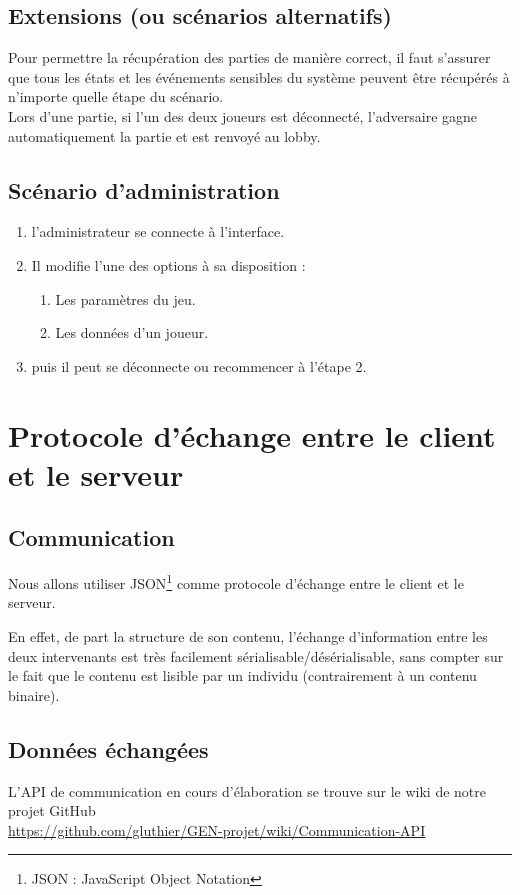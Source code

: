\documentclass[a4paper,11pt]{article}
\begin{document}
		\subsection{Extensions (ou scénarios alternatifs)}
		Pour permettre la récupération des parties de manière correct, il faut s'assurer que tous les états et les événements sensibles du système peuvent être récupérés à n'importe quelle étape du scénario. \\

		Lors d'une partie, si l'un des deux joueurs est déconnecté, l'adversaire gagne automatiquement la partie et est renvoyé au lobby.

		\subsection{Scénario d'administration}
		\begin{enumerate}
			\item l'administrateur se connecte à l'interface.
			\item Il modifie l'une des options à sa disposition :
			\begin{enumerate}
				\item Les paramètres du jeu.
				\item Les données d'un joueur.
			\end{enumerate}
			\item puis il peut se déconnecte ou recommencer à l'étape 2.
		\end{enumerate}


	\newpage
	\section{Protocole d'échange entre le client et le serveur}
		\subsection{Communication}
			Nous allons utiliser JSON\footnote{JSON : JavaScript Object Notation} comme protocole d'échange entre le client et le serveur. \par
			En effet, de part la structure de son contenu, l'échange d'information entre les deux intervenants est très facilement sérialisable/désérialisable, sans compter sur le fait que le contenu est lisible par un individu (contrairement à un contenu binaire).

		\subsection{Données échangées}
			L'API de communication en cours d'élaboration se trouve sur le wiki de notre projet GitHub \\ \url{https://github.com/gluthier/GEN-projet/wiki/Communication-API}
\end{document}
